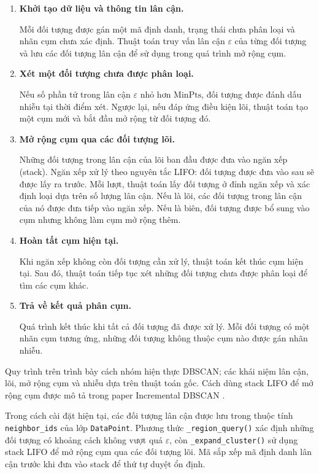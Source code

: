 \begin{enumerate}[label=\textbf{Bước \arabic*.}, leftmargin=*, itemsep=5pt]

    \item \textbf{Khởi tạo dữ liệu và thông tin lân cận.}

    Mỗi đối tượng được gán một mã định danh, trạng thái chưa phân loại và nhãn cụm chưa xác định. Thuật toán truy vấn lân cận \(\varepsilon\) của từng đối tượng và lưu các đối tượng lân cận để sử dụng trong quá trình mở rộng cụm.

    \item \textbf{Xét một đối tượng chưa được phân loại.}

    Nếu số phần tử trong lân cận \(\varepsilon\) nhỏ hơn \(\mathrm{MinPts}\), đối tượng được đánh dấu nhiễu tại thời điểm xét. Ngược lại, nếu đáp ứng điều kiện lõi, thuật toán tạo một cụm mới và bắt đầu mở rộng từ đối tượng đó.

    \item \textbf{Mở rộng cụm qua các đối tượng lõi.}

    Những đối tượng trong lân cận của lõi ban đầu được đưa vào ngăn xếp (stack). Ngăn xếp xử lý theo nguyên tắc LIFO: đối tượng được đưa vào sau sẽ được lấy ra trước. Mỗi lượt, thuật toán lấy đối tượng ở đỉnh ngăn xếp và xác định loại dựa trên số lượng lân cận. Nếu là lõi, các đối tượng trong lân cận của nó được đưa tiếp vào ngăn xếp. Nếu là biên, đối tượng được bổ sung vào cụm nhưng không làm cụm mở rộng thêm.

    \item \textbf{Hoàn tất cụm hiện tại.}

    Khi ngăn xếp không còn đối tượng cần xử lý, thuật toán kết thúc cụm hiện tại. Sau đó, thuật toán tiếp tục xét những đối tượng chưa được phân loại để tìm các cụm khác.

    \item \textbf{Trả về kết quả phân cụm.}

    Quá trình kết thúc khi tất cả đối tượng đã được xử lý. Mỗi đối tượng có một nhãn cụm tương ứng, những đối tượng không thuộc cụm nào được gán nhãn nhiễu.
\end{enumerate}

Quy trình trên trình bày cách nhóm hiện thực DBSCAN; các khái niệm lân cận, lõi, mở rộng cụm và nhiễu dựa trên thuật toán gốc. Cách dùng stack LIFO để mở rộng cụm được mô tả trong paper Incremental DBSCAN \parencite{ester1996dbscan,ester1998incrementaldbscan}.

Trong cách cài đặt hiện tại, các đối tượng lân cận được lưu trong thuộc tính \texttt{neighbor\_ids} của lớp \texttt{DataPoint}. Phương thức \texttt{\_region\_query()} xác định những đối tượng có khoảng cách không vượt quá \(\varepsilon\), còn \texttt{\_expand\_cluster()} sử dụng stack LIFO để mở rộng cụm qua các đối tượng lõi. Mã sắp xếp mã định danh lân cận trước khi đưa vào stack để thứ tự duyệt ổn định.

